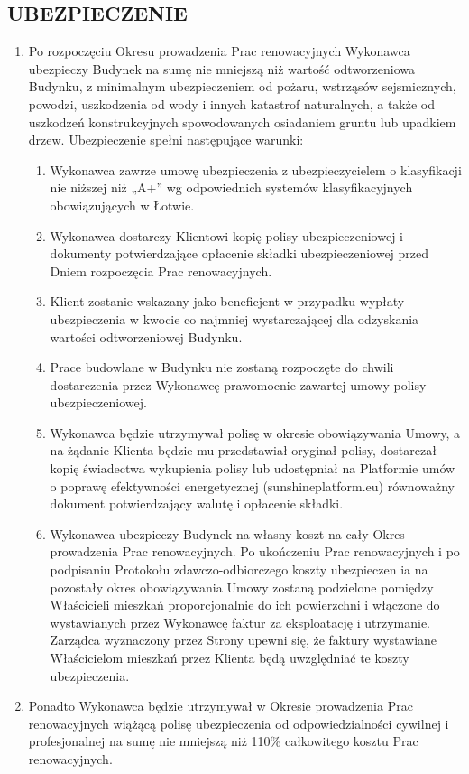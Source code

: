 \begin{multicols}{2}
\subsection{UBEZPIECZENIE}
\begin{enumerate}
	\item Po rozpoczęciu Okresu prowadzenia Prac renowacyjnych Wykonawca ubezpieczy Budynek na sumę nie mniejszą niż wartość odtworzeniowa Budynku, z minimalnym ubezpieczeniem od pożaru, wstrząsów sejsmicznych, powodzi, uszkodzenia od wody i innych katastrof naturalnych, a także od uszkodzeń konstrukcyjnych spowodowanych osiadaniem gruntu lub upadkiem drzew. Ubezpieczenie spełni następujące warunki:
	\begin{enumerate}
		\item Wykonawca zawrze umowę ubezpieczenia z ubezpieczycielem o klasyfikacji nie niższej niż „A+” wg odpowiednich systemów klasyfikacyjnych obowiązujących w Łotwie.
		\item Wykonawca dostarczy Klientowi kopię polisy ubezpieczeniowej i dokumenty potwierdzające opłacenie składki ubezpieczeniowej przed Dniem rozpoczęcia Prac renowacyjnych.
		\item Klient zostanie wskazany jako beneficjent w przypadku wypłaty ubezpieczenia w kwocie co najmniej wystarczającej dla odzyskania wartości odtworzeniowej Budynku.
		\item Prace budowlane w Budynku nie zostaną rozpoczęte do chwili dostarczenia przez Wykonawcę prawomocnie zawartej umowy polisy ubezpieczeniowej.
		\item Wykonawca będzie utrzymywał polisę w okresie obowiązywania Umowy, a na żądanie Klienta będzie mu przedstawiał oryginał polisy, dostarczał kopię świadectwa wykupienia polisy lub udostępniał na Platformie umów o poprawę efektywności energetycznej (sunshineplatform.eu) równoważny dokument potwierdzający walutę i opłacenie składki.
		\item Wykonawca ubezpieczy Budynek na własny koszt na cały Okres prowadzenia Prac renowacyjnych. Po ukończeniu Prac renowacyjnych i po podpisaniu Protokołu zdawczo-odbiorczego koszty ubezpieczen ia na pozostały okres obowiązywania Umowy zostaną podzielone pomiędzy Właścicieli mieszkań proporcjonalnie do ich powierzchni i włączone do wystawianych przez Wykonawcę faktur za eksploatację i utrzymanie. Zarządca wyznaczony przez Strony upewni się, że faktury wystawiane Właścicielom mieszkań przez Klienta będą uwzględniać te koszty ubezpieczenia.
	\end{enumerate}
	\item Ponadto Wykonawca będzie utrzymywał w Okresie prowadzenia Prac renowacyjnych wiążącą polisę ubezpieczenia od odpowiedzialności cywilnej i profesjonalnej na sumę nie mniejszą niż 110\% całkowitego kosztu Prac renowacyjnych.
\end{enumerate}


\end{multicols}
